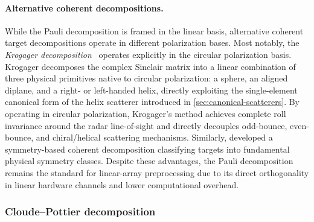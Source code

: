 \paragraph{Alternative coherent decompositions.}
While the Pauli decomposition is framed in the linear basis, alternative coherent target decompositions operate in different polarization bases.
Most notably, the \emph{Krogager decomposition}~\parencite{krogagerNewDecompositionRadar1990} operates explicitly in the circular polarization basis.
Krogager decomposes the complex Sinclair matrix into a linear combination of three physical primitives native to circular polarization: a sphere, an aligned diplane, and a right- or left-handed helix, directly exploiting the single-element canonical form of the helix scatterer introduced in \cref{sec:canonical-scatterers}.
By operating in circular polarization, Krogager's method achieves complete roll invariance around the radar line-of-sight and directly decouples odd-bounce, even-bounce, and chiral/helical scattering mechanisms.
Similarly, \textcite{cameronFeatureMotivatedPolarization1990} developed a symmetry-based coherent decomposition classifying targets into fundamental physical symmetry classes.
Despite these advantages, the Pauli decomposition remains the standard for linear-array preprocessing due to its direct orthogonality in linear hardware channels and lower computational overhead.


\subsubsection{Cloude--Pottier decomposition}
\label{sec:cloude-pottier-decomposition}

